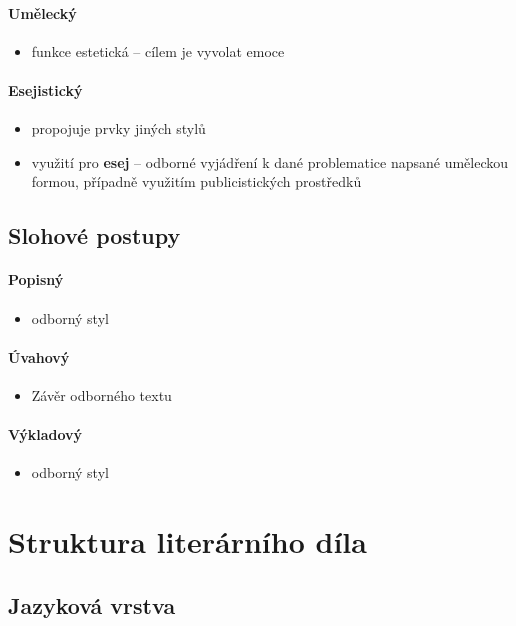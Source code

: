 \paragraph{Umělecký}
\begin{itemize}
\item funkce estetická -- cílem je vyvolat emoce
\end{itemize}

\paragraph{Esejistický}
\begin{itemize}
\item propojuje prvky jiných stylů
\item využití pro \textbf{esej} -- odborné vyjádření k dané problematice napsané uměleckou formou, případně využitím publicistických prostředků
\end{itemize}

\subsection{Slohové postupy}
\paragraph{Popisný}
\begin{itemize}
\item odborný styl
\end{itemize}

\paragraph{Úvahový}
\begin{itemize}
\item Závěr odborného textu
\end{itemize}

\paragraph{Výkladový}
\begin{itemize}
\item odborný styl
\end{itemize}

\newpage
\section{Struktura literárního díla}
\subsection{Jazyková vrstva}
